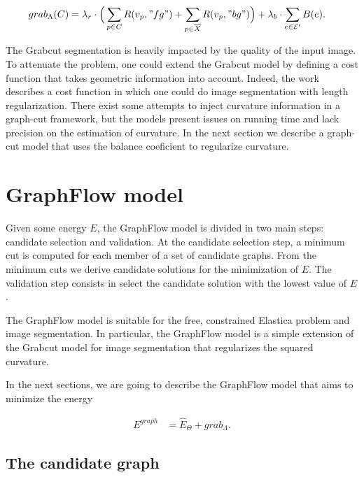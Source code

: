 \begin{align*}
	grab_{\Lambda}(C) &= \lambda_r \cdot \Big( \sum_{p \in C}{R(v_p,"fg")} + \sum_{p \in \overline{X}}{R(v_p,"bg")} \Big) + \lambda_b \cdot \sum_{e \in \mathcal{E}'}{B(e)}.
\end{align*}


The Grabcut segmentation is heavily impacted by the quality of the input image. To attenuate the problem, one could extend the Grabcut model by defining a cost function that takes geometric information into account. Indeed, the work \cite{boykov03geodesics} describes a cost function in which one could do image segmentation with length regularization. There exist some attempts \cite{nieuwenhuis14efficient,zehiry10fast} to inject curvature information in a graph-cut framework, but the models present issues on running time and lack precision on the estimation of curvature. In the next section we describe a graph-cut model that uses the balance coeficient to regularize curvature.


\section{GraphFlow model}
Given some energy $E$, the GraphFlow model is divided in two main steps: candidate selection and validation. At the candidate selection step, a minimum cut is computed for each member of a set of candidate graphs. From the minimum cuts we derive candidate solutions for the minimization of $E$. The validation step consists in select the candidate solution with the lowest value of $E$.

The GraphFlow model is suitable for the free, constrained Elastica problem and image segmentation. In particular, the GraphFlow model is a simple extension of the Grabcut model for image segmentation that regularizes the squared curvature.

In the next sections, we are going to describe the GraphFlow model that aims to minimize the energy

\begin{align}
E^{graph} &= \hat{E}_{\Theta} + grab_{\Lambda}.
\label{eq:graphflow-energy}
\end{align}


\subsection{The candidate graph}


